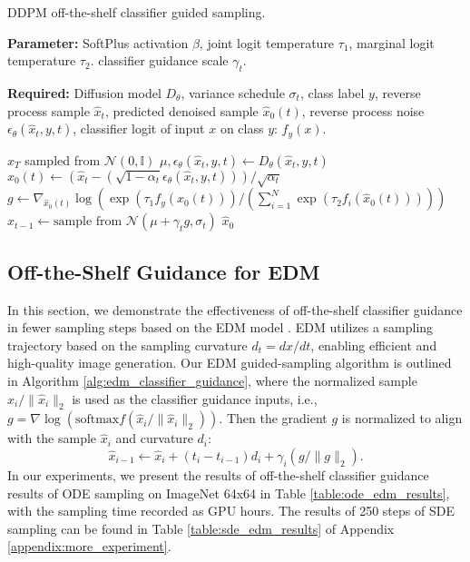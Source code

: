 \documentclass{article}
\theoremstyle{definition}
\begin{document}
\begin{algorithm}
\caption{DDPM off-the-shelf classifier guided sampling.}\label{alg:ddpm_guidance}
\begin{algorithmic}

\State \textbf{Parameter:} SoftPlus activation $\beta$, joint logit temperature $\tau_1$, marginal logit temperature $\tau_2$. classifier guidance scale $\gamma_t$.

\State \textbf{Required:} Diffusion model $D_\theta$, variance schedule $\sigma_t$, class label $y$, reverse process sample $\hat{x}_t$, predicted denoised sample $\hat{x}_0(t)$, reverse process noise $\epsilon_{\theta}(\hat{x}_t,y,t)$, classifier logit of input $x$ on class $y$: $f_y(x)$. 

\State $\hat{x}_T$ sampled from $\mathcal{N}(0,\mathbb{I})$ 
\State $\mu, \epsilon_{\theta}(\hat{x}_t,y,t) \gets D_\theta(\hat{x}_t,y,t) $
\State $ \hat{x}_0(t) \gets (\hat{x}_t - (\sqrt{1-\alpha_t}\epsilon_{\theta}(\hat{x}_t,y,t))) / \sqrt{\alpha_t} $       
\State $ g \gets  \nabla_{\hat{x}_0(t)}\log( \exp(\tau_1 f_y(\hat{x}_0(t))) / (\sum^N_{i=1} \exp(\tau_2 f_i(\hat{x}_0(t)))) ) $ 
\State $\hat{x}_{t-1} \gets \text{sample from } \mathcal{N}(\mu + \gamma_t  g, \sigma_t) $
\EndFor 
\State \Return $\hat{x}_0$
\end{algorithmic}
\end{algorithm}


\subsection{Off-the-Shelf Guidance for EDM}
In this section, we demonstrate the effectiveness of off-the-shelf classifier guidance in fewer sampling steps based on the EDM model \citep{karras2022edm}. 
EDM utilizes a sampling trajectory based on the sampling curvature $d_t=dx/dt$, enabling efficient and high-quality image generation. Our EDM guided-sampling algorithm is outlined in Algorithm \ref{alg:edm_classifier_guidance}, where the normalized sample $\hat{x}_i / \lVert \hat{x}_i \rVert_2$ is used as the classifier guidance inputs, i.e., $ g = \nabla \log(\text{softmax}f (\hat{x}_i / \lVert \hat{x}_i \rVert_2)) $. Then the gradient $g$ is normalized to align with the sample $\hat{x}_i$ and curvature $d_i$: $$ \hat{x}_{i-1} \gets \hat{x}_i + (t_i-t_{i-1})d_i + \gamma_i (g / \lVert g \rVert_2). $$ In our experiments, we present the results of off-the-shelf classifier guidance results of ODE sampling on ImageNet 64x64 in Table \ref{table:ode_edm_results}, with the sampling time recorded as GPU hours. The results of 250 steps of SDE sampling \citep{kingma2023variational} can be found in Table \ref{table:sde_edm_results} of Appendix \ref{appendix:more_experiment}.
\end{document}
